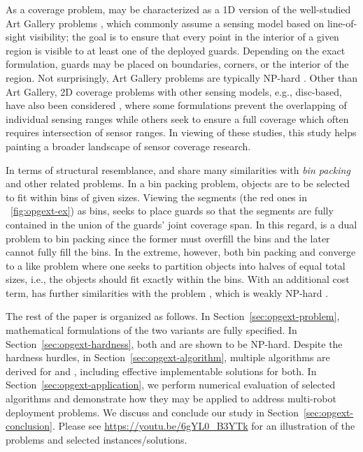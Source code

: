 As a coverage problem, \opg may be characterized as a 1D version 
of the well-studied Art Gallery problems  \cite{o1987art,shermer1992recent},
which commonly assume a sensing model based on line-of-sight 
visibility\cite{lozano1979algorithm}; the goal is to ensure that every point
in the  interior of a given region is visible to at least one of the deployed 
guards. Depending on the exact formulation, guards may be placed on 
boundaries, corners, or the interior of the region. Not surprisingly, Art
Gallery problems are typically NP-hard \cite{lee1986computational}. Other
than Art Gallery, 2D coverage problems with other sensing models, e.g., 
disc-based, have also been considered \cite{thue1910dichteste,hales2005proof,
drezner1995facility,cortes2004coverage,pavone2009equitable
,pierson2017adapting}, where some formulations prevent the overlapping 
of individual sensing ranges \cite{thue1910dichteste,hales2005proof} while 
others seek to ensure a full coverage which often requires intersection
of sensor ranges. 
%
In viewing of these studies, this study helps painting a broader landscape 
of sensor coverage research.

In terms of structural resemblance, \opglr and \opgmc share many similarities 
with {\em bin packing}  \cite{johnson1973near} and other related problems. 
In a bin packing problem, objects are to be selected to fit within bins of 
given sizes. Viewing the segments (the red ones in ~\ref{fig:opgext-ex}) as 
bins, \opg seeks to place guards so that the segments are fully contained in 
the union of the guards' joint coverage span. In this regard, \opg is a dual
problem to bin packing since the former must overfill the bins and the later 
cannot fully fill the bins. In the extreme, however, both bin packing and 
\opg converge to a \subsetsum \cite{karp1972reducibility} like problem where 
one seeks to partition objects into halves of equal total sizes, i.e., the 
objects should fit exactly within the bins. With an additional cost term, 
\opgmc has further similarities with the \ttkp problem \cite{lueker1975two}, 
which is weakly NP-hard \cite{dantzig1957discrete}.

The rest of the paper is organized as follows. In Section~\ref{sec:opgext-problem},
mathematical formulations of the two \opg variants are fully specified. In
Section~\ref{sec:opgext-hardness}, both \opglr and \opgmc are shown to be 
NP-hard. Despite the hardness hurdles, in Section~\ref{sec:opgext-algorithm}, 
multiple algorithms are derived for \opglr and \opgmc, including effective
implementable solutions for both. In Section~\ref{sec:opgext-application},
we perform numerical evaluation of selected algorithms and demonstrate 
how they may be applied to address multi-robot deployment problems. We 
discuss and conclude our study in Section~\ref{sec:opgext-conclusion}. Please
see \url{https://youtu.be/6gYL0_B3YTk} for an illustration of the problems 
and selected instances/solutions. 